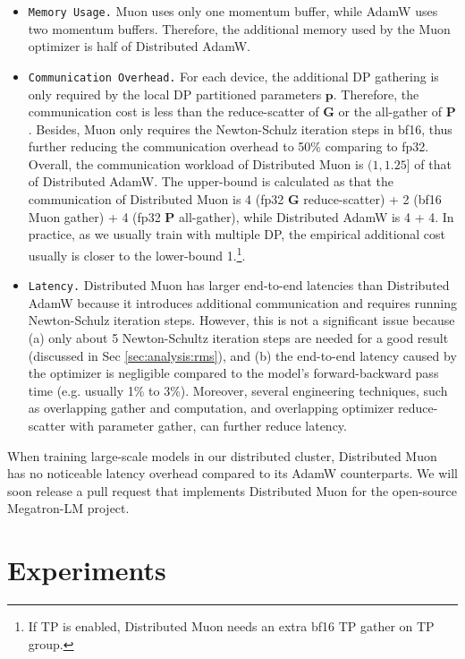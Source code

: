 \begin{itemize}
\item \texttt{Memory Usage.} Muon uses only one momentum buffer, while AdamW uses two momentum buffers. Therefore, the additional memory used by the Muon optimizer is half of Distributed AdamW.

\item \texttt{Communication Overhead.} For each device, the additional DP gathering is only required by the local DP partitioned parameters $\mathbf{p}$. Therefore, the communication cost is less than the reduce-scatter of $\mathbf{G}$ or the all-gather of $\mathbf{P}$. Besides, Muon only requires the Newton-Schulz iteration steps in bf16, thus further reducing the communication overhead to 50\% comparing to fp32. Overall, the communication workload of Distributed Muon is $(1, 1.25]$ of that of Distributed AdamW. The upper-bound is calculated as that the communication of Distributed Muon is 4 (fp32 $\mathbf{G}$ reduce-scatter) + 2 (bf16 Muon gather) + 4 (fp32 $\mathbf{P}$ all-gather), while Distributed AdamW is 4 + 4. In practice, as we usually train with multiple DP, the empirical additional cost usually is closer to the lower-bound 1.\footnote{If TP is enabled, Distributed Muon needs an extra bf16 TP gather on TP group.}.

\item \texttt{Latency.} Distributed Muon has larger end-to-end latencies than Distributed AdamW because it introduces additional communication and requires running Newton-Schulz iteration steps. However, this is not a significant issue because (a) only about 5 Newton-Schultz iteration steps are needed for a good result (discussed in Sec \ref{sec:analysis:rms}), and (b) the end-to-end latency caused by the optimizer is negligible compared to the model's forward-backward pass time (e.g. usually 1\% to 3\%). Moreover, several engineering techniques, such as overlapping gather and computation, and overlapping optimizer reduce-scatter with parameter gather, can further reduce latency.


\end{itemize}

When training large-scale models in our distributed cluster, Distributed Muon has no noticeable latency overhead compared to its AdamW counterparts. We will soon release a pull request that implements Distributed Muon for the open-source Megatron-LM \citep{shoeybi2020megatronlmtrainingmultibillionparameter} project.


\section{Experiments}

